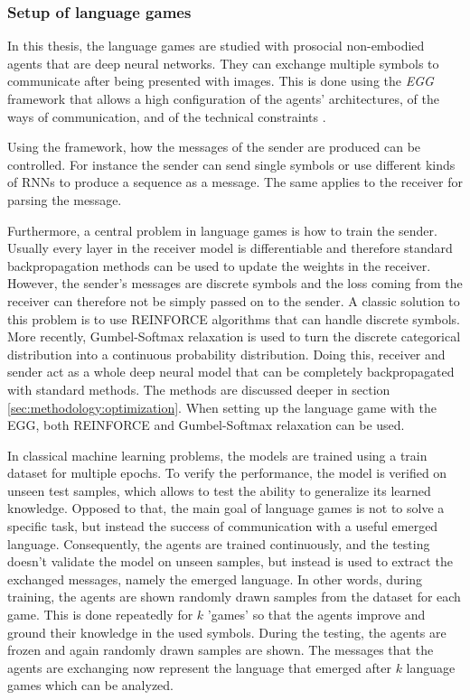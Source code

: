 \subsubsection{Setup of language games}
\label{sec:background:lg:setup}
In this thesis, the language games are studied with prosocial non-embodied agents that are deep neural networks.
They can exchange multiple symbols to communicate after being presented with images.
This is done using the \emph{EGG} framework that allows a high configuration of the agents' architectures, of the ways of communication, and of the technical constraints \citep{Kharitonov2019}.

Using the framework, how the messages of the sender are produced can be controlled.
For instance the sender can send single symbols or use different kinds of RNNs to produce a sequence as a message.
The same applies to the receiver for parsing the message.

Furthermore, a central problem in language games is how to train the sender.
Usually every layer in the receiver model is differentiable and therefore standard backpropagation methods can be used to update the weights in the receiver.
However, the sender's messages are discrete symbols and the loss coming from the receiver can therefore not be simply passed on to the sender.
A classic solution to this problem is to use REINFORCE algorithms \citep{Williams1992} that can handle discrete symbols.
More recently, Gumbel-Softmax relaxation \citep{Jang2017} is used to turn the discrete categorical distribution into a continuous probability distribution.
Doing this, receiver and sender act as a whole deep neural model that can be completely backpropagated with standard methods.
The methods are discussed deeper in section \ref{sec:methodology:optimization}.
When setting up the language game with the EGG, both REINFORCE and Gumbel-Softmax relaxation can be used.

In classical machine learning problems, the models are trained using a train dataset for multiple epochs.
To verify the performance, the model is verified on unseen test samples, which allows to test the ability to generalize its learned knowledge.
Opposed to that, the main goal of language games is not to solve a specific task, but instead the success of communication with a useful emerged language.
Consequently, the agents are trained continuously, and the testing doesn't validate the model on unseen samples, but instead is used to extract the exchanged messages, namely the emerged language.
In other words, during training, the agents are shown randomly drawn samples from the dataset for each game.
This is done repeatedly for $k$ 'games' so that the agents improve and ground their knowledge in the used symbols.
During the testing, the agents are frozen and again randomly drawn samples are shown.
The messages that the agents are exchanging now represent the language that emerged after $k$ language games which can be analyzed.

